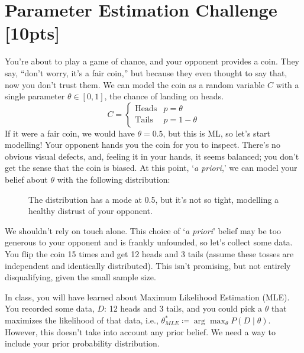 \section{Parameter Estimation Challenge [10pts]}
You're about to play a game of chance, and your opponent provides a coin. They say, ``don't worry, it's a fair coin,'' but because they even thought to say that, now you don't trust them. We can model the coin as a random variable $C$ with a single parameter $\theta\in[0,1]$, the chance of landing on heads.
$$C=\begin{cases}
    \text{Heads} & p=\theta \\
    \text{Tails} & p=1-\theta
\end{cases}$$
If it were a fair coin, we would have $\theta=0.5$, but this is ML, so let's start modelling! Your opponent hands you the coin for you to inspect. There's no obvious visual defects, and, feeling it in your hands, it seems balanced; you don't get the sense that the coin is biased. At this point, `\textit{a priori},' we can model your belief about $\theta$ with the following distribution:

\begin{figure}[htbp]
    \centering
{}
\caption{The distribution has a mode at 0.5, but it's not so tight, modelling a healthy distrust of your opponent.}
\end{figure}

We shouldn't rely on touch alone. This choice of `\textit{a priori}' belief may be too generous to your opponent and is frankly unfounded, so let's collect some data. You flip the coin 15 times and get 12 heads and 3 tails (assume these tosses are independent and identically distributed). This isn't promising, but not entirely disqualifying, given the small sample size.

\bigskip In class, you will have learned about Maximum Likelihood Estimation (MLE). You recorded some data, $D$: 12 heads and 3 tails, and you could pick a $\theta$ that maximizes the likelihood of that data, i.e., $\theta^*_{MLE} \coloneq \arg\max_\theta P(D \mid \theta)$. However, this doesn't take into account any prior belief. We need a way to include your prior probability distribution.

